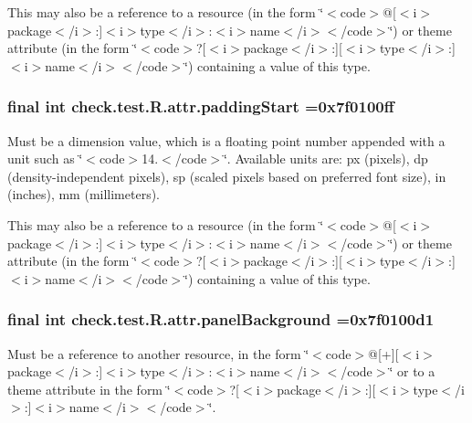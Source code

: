 This may also be a reference to a resource (in the form \char`\"{}$<$code$>$@\mbox{[}$<$i$>$package$<$/i$>$\+:\mbox{]}$<$i$>$type$<$/i$>$\+:$<$i$>$name$<$/i$>$$<$/code$>$\char`\"{}) or theme attribute (in the form \char`\"{}$<$code$>$?\mbox{[}$<$i$>$package$<$/i$>$\+:\mbox{]}\mbox{[}$<$i$>$type$<$/i$>$\+:\mbox{]}$<$i$>$name$<$/i$>$$<$/code$>$\char`\"{}) containing a value of this type. \hypertarget{classcheck_1_1test_1_1_r_1_1attr_a1e5a8103a877312cb676b708423cc823}{}
\subsubsection[{padding\+Start}]{\setlength{\rightskip}{0pt plus 5cm}final int check.\+test.\+R.\+attr.\+padding\+Start =0x7f0100ff\hspace{0.3cm}{\ttfamily [static]}}\label{classcheck_1_1test_1_1_r_1_1attr_a1e5a8103a877312cb676b708423cc823}
Must be a dimension value, which is a floating point number appended with a unit such as \char`\"{}$<$code$>$14.\+5sp$<$/code$>$\char`\"{}. Available units are\+: px (pixels), dp (density-\/independent pixels), sp (scaled pixels based on preferred font size), in (inches), mm (millimeters). 

This may also be a reference to a resource (in the form \char`\"{}$<$code$>$@\mbox{[}$<$i$>$package$<$/i$>$\+:\mbox{]}$<$i$>$type$<$/i$>$\+:$<$i$>$name$<$/i$>$$<$/code$>$\char`\"{}) or theme attribute (in the form \char`\"{}$<$code$>$?\mbox{[}$<$i$>$package$<$/i$>$\+:\mbox{]}\mbox{[}$<$i$>$type$<$/i$>$\+:\mbox{]}$<$i$>$name$<$/i$>$$<$/code$>$\char`\"{}) containing a value of this type. \hypertarget{classcheck_1_1test_1_1_r_1_1attr_a67199b3cdfd107c7f6b17e7083ccff84}{}
\subsubsection[{panel\+Background}]{\setlength{\rightskip}{0pt plus 5cm}final int check.\+test.\+R.\+attr.\+panel\+Background =0x7f0100d1\hspace{0.3cm}{\ttfamily [static]}}\label{classcheck_1_1test_1_1_r_1_1attr_a67199b3cdfd107c7f6b17e7083ccff84}
Must be a reference to another resource, in the form \char`\"{}$<$code$>$@\mbox{[}+\mbox{]}\mbox{[}$<$i$>$package$<$/i$>$\+:\mbox{]}$<$i$>$type$<$/i$>$\+:$<$i$>$name$<$/i$>$$<$/code$>$\char`\"{} or to a theme attribute in the form \char`\"{}$<$code$>$?\mbox{[}$<$i$>$package$<$/i$>$\+:\mbox{]}\mbox{[}$<$i$>$type$<$/i$>$\+:\mbox{]}$<$i$>$name$<$/i$>$$<$/code$>$\char`\"{}. \hypertarget{classcheck_1_1test_1_1_r_1_1attr_a6f31f89058cb2734f29f1bb7913c05db}{}
